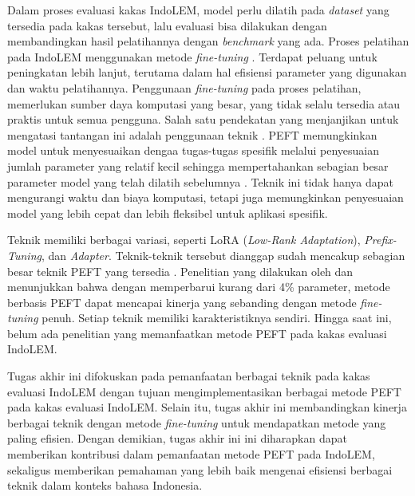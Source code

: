 Dalam proses evaluasi kakas IndoLEM, model perlu dilatih pada \textit{dataset} yang tersedia pada kakas tersebut, lalu evaluasi bisa dilakukan dengan membandingkan hasil pelatihannya dengan \textit{benchmark} yang ada. Proses pelatihan pada IndoLEM menggunakan metode \textit{fine-tuning} \parencite{indolem}. Terdapat peluang untuk peningkatan lebih lanjut, terutama dalam hal efisiensi parameter yang digunakan dan waktu pelatihannya. Penggunaan \textit{fine-tuning} pada proses pelatihan, memerlukan sumber daya komputasi yang besar, yang tidak selalu tersedia atau praktis untuk semua pengguna. Salah satu pendekatan yang menjanjikan untuk mengatasi tantangan ini adalah penggunaan teknik \PEFT. PEFT memungkinkan model untuk menyesuaikan dengaa tugas-tugas spesifik melalui penyesuaian jumlah parameter yang relatif kecil sehingga mempertahankan sebagian besar parameter model yang telah dilatih sebelumnya \parencite{adapter_houlsby}. Teknik ini tidak hanya dapat mengurangi waktu dan biaya komputasi, tetapi juga memungkinkan penyesuaian model yang lebih cepat dan lebih fleksibel untuk aplikasi spesifik. 

Teknik \PEFT memiliki berbagai variasi, seperti LoRA (\textit{Low-Rank Adaptation}), \textit{Prefix-Tuning}, dan \textit{Adapter}. Teknik-teknik tersebut dianggap sudah mencakup sebagian besar teknik PEFT yang tersedia \parencite{unipelt}. Penelitian yang dilakukan oleh \citeauthor{adapter_houlsby} \parencite{adapter_houlsby} dan \citeauthor{uvpl} \parencite{uvpl} menunjukkan bahwa dengan memperbarui kurang dari 4\% parameter, metode berbasis PEFT dapat mencapai kinerja yang sebanding dengan metode \textit{fine-tuning} penuh. Setiap teknik memiliki karakteristiknya sendiri. Hingga saat ini, belum ada penelitian yang memanfaatkan metode PEFT pada kakas evaluasi IndoLEM.

Tugas akhir ini  difokuskan pada pemanfaatan berbagai teknik \PEFT pada kakas evaluasi IndoLEM dengan tujuan mengimplementasikan berbagai metode PEFT pada kakas evaluasi IndoLEM. Selain itu, tugas akhir ini  membandingkan kinerja berbagai teknik \PEFT dengan metode \textit{fine-tuning}  untuk mendapatkan metode yang paling efisien. Dengan demikian, tugas akhir ini ini diharapkan dapat memberikan kontribusi dalam pemanfaatan metode PEFT pada IndoLEM, sekaligus memberikan pemahaman yang lebih baik mengenai efisiensi berbagai teknik \PEFT dalam konteks bahasa Indonesia.
